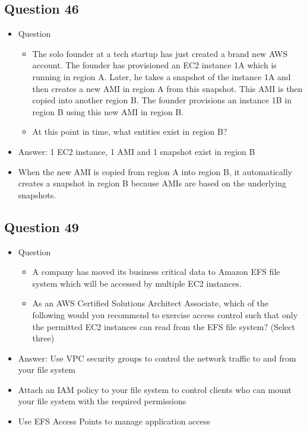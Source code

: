 \documentclass[]{scrartcl}
\begin{document}
\subsection{Question 46}
\begin{itemize}
	\item Question
	\begin{itemize}
		\item The solo founder at a tech startup has just created a brand new AWS account. The founder has provisioned an EC2 instance 1A which is running in region A. Later, he takes a snapshot of the instance 1A and then creates a new AMI in region A from this snapshot. This AMI is then copied into another region B. The founder provisions an instance 1B in region B using this new AMI in region B.
		\item At this point in time, what entities exist in region B?
	\end{itemize}
	\item Answer: 1 EC2 instance, 1 AMI and 1 snapshot exist in region B
	\item When the new AMI is copied from region A into region B, it automatically creates a snapshot in region B because AMIs are based on the underlying snapshots.
\end{itemize}

\subsection{Question 49}
\begin{itemize}
	\item Question
	\begin{itemize}
		\item A company has moved its business critical data to Amazon EFS file system which will be accessed by multiple EC2 instances.
		\item As an AWS Certified Solutions Architect Associate, which of the following would you recommend to exercise access control such that only the permitted EC2 instances can read from the EFS file system? (Select three)
	\end{itemize}
	\item Answer: Use VPC security groups to control the network traffic to and from your file system
	\item Attach an IAM policy to your file system to control clients who can mount your file system with the required permissions
	\item Use EFS Access Points to manage application access
\end{itemize}
\end{document}
